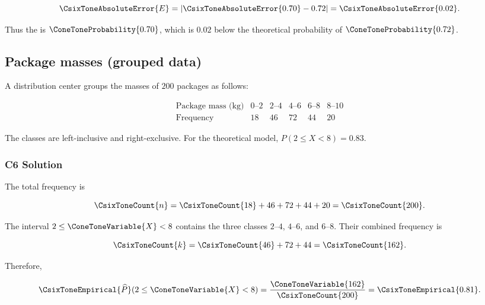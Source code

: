 \[
\CsixToneAbsoluteError{E}=|\CsixToneAbsoluteError{0.70}-0.72|=\CsixToneAbsoluteError{0.02}.
\]

Thus the   is $\ConeToneProbability{0.70}$, which is $0.02$ below the
theoretical probability of $\ConeToneProbability{0.72}$.


\subsection{Package masses (grouped data)}
\label{sec:c6-only-grouped}

A distribution center groups the masses of $200$ packages as follows:

\[
\begin{array}{c|ccccc}
	\text{Package mass (kg)}
	& 0\text{--}2 & 2\text{--}4 & 4\text{--}6 & 6\text{--}8 & 8\text{--}10 \\ \hline
	\text{Frequency} & 18 & 46 & 72 & 44 & 20
\end{array}
\]

The classes are left-inclusive and right-exclusive. For the theoretical
model, $P(2\leq X<8)=0.83$.


\subsubsection*{C6 Solution}
\label{subsec:c6-only-grouped-solution}

The total frequency is

\[
\CsixToneCount{n}=\CsixToneCount{18}+46+72+44+20=\CsixToneCount{200}.
\]

The interval $2\leq \ConeToneVariable{X}<8$ contains the three classes $2$--$4$, $4$--$6$,
and $6$--$8$. Their combined frequency is

\[
\CsixToneCount{k}=\CsixToneCount{46}+72+44=\CsixToneCount{162}.
\]

Therefore,

\[
\CsixToneEmpirical{\widehat P}(2\leq \ConeToneVariable{X}<8)=\frac{\ConeToneVariable{162}}{\CsixToneCount{200}}=\CsixToneEmpirical{0.81}.
\]

